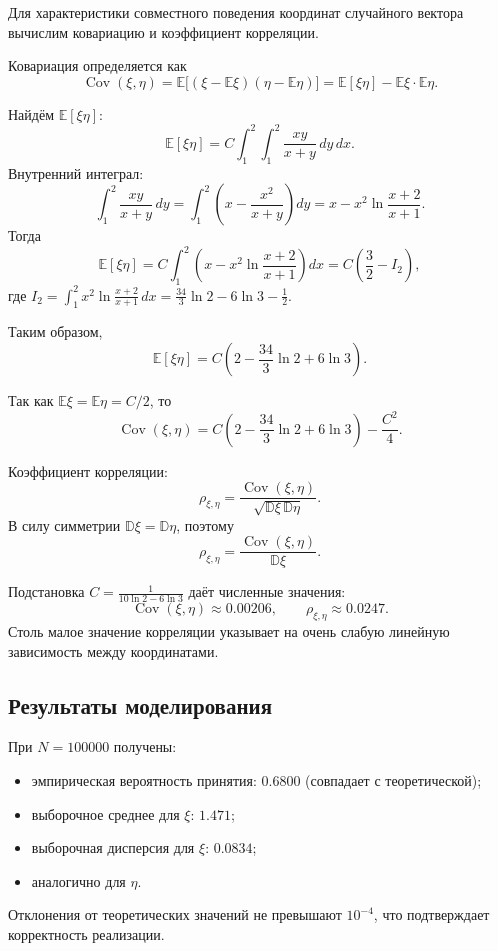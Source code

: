 \documentclass[bachelor, och, pract3]{SCWorks}
\begin{document}
Для характеристики совместного поведения координат случайного вектора вычислим ковариацию и коэффициент корреляции.

Ковариация определяется как
\[
\operatorname{Cov}(\xi,\eta)=\mathbb E\big[(\xi-\mathbb E\xi)(\eta-\mathbb E\eta)\big]
= \mathbb E[\xi\eta]-\mathbb E\xi\cdot\mathbb E\eta.
\]

Найдём \(\mathbb E[\xi\eta]\):
\[
\mathbb E[\xi\eta] = C\int_1^2\int_1^2 \frac{xy}{x+y}\,dy\,dx.
\]
Внутренний интеграл:
\[
\int_1^2 \frac{xy}{x+y}\,dy
= \int_1^2 \left(x - \frac{x^2}{x+y}\right)dy
= x - x^2\ln\frac{x+2}{x+1}.
\]
Тогда
\[
\mathbb E[\xi\eta] = C\int_1^2 \left(x - x^2\ln\frac{x+2}{x+1}\right)dx
= C\left(\frac{3}{2} - I_2\right),
\]
где \(I_2 = \int_1^2 x^2\ln\frac{x+2}{x+1}\,dx = \frac{34}{3}\ln2 - 6\ln3 - \frac12\).

Таким образом,
\[
\mathbb E[\xi\eta] = C\left(2 - \frac{34}{3}\ln2 + 6\ln3\right).
\]

Так как \(\mathbb E\xi = \mathbb E\eta = C/2\), то
\[
\operatorname{Cov}(\xi,\eta) = C\left(2 - \frac{34}{3}\ln2 + 6\ln3\right) - \frac{C^2}{4}.
\]

Коэффициент корреляции:
\[
\rho_{\xi,\eta} = \frac{\operatorname{Cov}(\xi,\eta)}{\sqrt{\mathbb D\xi\,\mathbb D\eta}}.
\]
В силу симметрии \(\mathbb D\xi = \mathbb D\eta\), поэтому
\[
\rho_{\xi,\eta} = \frac{\operatorname{Cov}(\xi,\eta)}{\mathbb D\xi}.
\]

Подстановка \(C = \frac{1}{10\ln2 - 6\ln3}\) даёт численные значения:
\[
\operatorname{Cov}(\xi,\eta) \approx 0.00206, \qquad \rho_{\xi,\eta} \approx 0.0247.
\]
Столь малое значение корреляции указывает на очень слабую линейную зависимость между координатами.


\subsection{Результаты моделирования}

При $N=100000$ получены:
\begin{itemize}
    \item эмпирическая вероятность принятия: $0.6800$ (совпадает с теоретической);
    \item выборочное среднее для $\xi$: $1.471$;
    \item выборочная дисперсия для $\xi$: $0.0834$;
    \item аналогично для $\eta$.
\end{itemize}
Отклонения от теоретических значений не превышают $10^{-4}$, что подтверждает корректность реализации.
\end{document}
